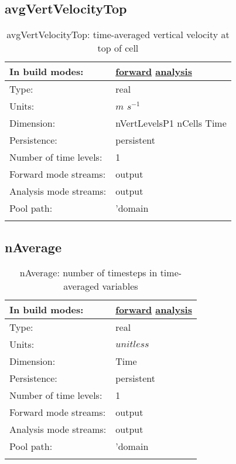 \subsection[avgVertVelocityTop]{avgVertVelocityTop}
\label{subsec:var_sec_average_avgVertVelocityTop}
\begin{center}
\begin{longtable}{| p{2.0in} | p{4.0in} |}
        \hline 
        In build modes: & \hyperref[subsec:forward_var_tab_average]{forward} \hyperref[subsec:analysis_var_tab_average]{analysis} \\
        \hline 
        Type: & real \\
        \hline 
        Units: & $m$ $s^{-1}$ \\
        \hline 
        Dimension: & nVertLevelsP1 nCells Time \\
        \hline 
        Persistence: & persistent \\
        \hline 
        Number of time levels: & 1 \\
        \hline 
		 Forward mode streams: &  output \\
        \hline 
		 Analysis mode streams: &  output \\
        \hline 
            Pool path: & 'domain %
 \\
		 \hline 
    \caption{avgVertVelocityTop: time-averaged vertical velocity at top of cell}
\end{longtable}
\end{center}
\subsection[nAverage]{nAverage}
\label{subsec:var_sec_average_nAverage}
\begin{center}
\begin{longtable}{| p{2.0in} | p{4.0in} |}
        \hline 
        In build modes: & \hyperref[subsec:forward_var_tab_average]{forward} \hyperref[subsec:analysis_var_tab_average]{analysis} \\
        \hline 
        Type: & real \\
        \hline 
        Units: & $unitless$ \\
        \hline 
        Dimension: & Time \\
        \hline 
        Persistence: & persistent \\
        \hline 
        Number of time levels: & 1 \\
        \hline 
		 Forward mode streams: &  output \\
        \hline 
		 Analysis mode streams: &  output \\
        \hline 
            Pool path: & 'domain %
 \\
		 \hline 
    \caption{nAverage: number of timesteps in time-averaged variables}
\end{longtable}
\end{center}

